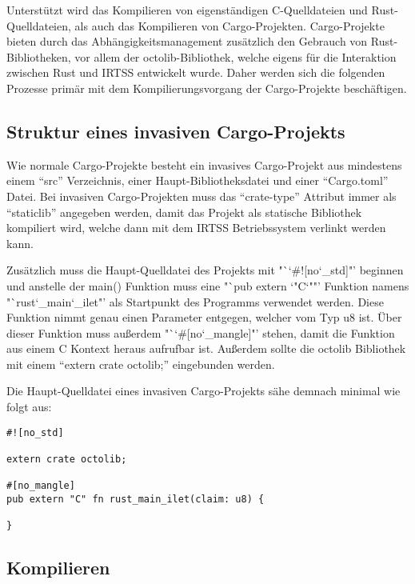 Unterstützt wird das Kompilieren von eigenständigen C-Quelldateien und Rust-Quelldateien, als auch das Kompilieren von
Cargo-Projekten. Cargo-Projekte bieten durch das Abhängigkeitsmanagement zusätzlich den Gebrauch von Rust-Bibliotheken, vor
allem der octolib-Bibliothek, welche eigens für die Interaktion zwischen Rust und IRTSS entwickelt wurde. Daher werden sich die
folgenden Prozesse primär mit dem Kompilierungsvorgang der Cargo-Projekte beschäftigen.

\subsection{Struktur eines invasiven Cargo-Projekts}

Wie normale Cargo-Projekte besteht ein invasives Cargo-Projekt aus mindestens einem "`src"' Verzeichnis, einer Haupt-Bibliotheksdatei
und einer "`Cargo.toml"' Datei. Bei invasiven Cargo-Projekten muss das "`crate-type"' Attribut immer als
"`staticlib"' angegeben werden,
damit das Projekt als statische Bibliothek kompiliert wird, welche dann mit dem IRTSS Betriebssystem verlinkt werden kann.

Zusätzlich muss die Haupt-Quelldatei des Projekts mit "`\char`#![no\char`_std]"' beginnen und anstelle der main()
Funktion muss eine "`pub extern \char`"C\char`""' Funktion namens "`rust\char`_main\char`_ilet"' als Startpunkt des Programms
verwendet werden.
Diese Funktion nimmt genau einen Parameter entgegen, welcher vom Typ u8 ist.
Über dieser  Funktion muss außerdem "`\char`#[no\char`_mangle]"' stehen, damit die Funktion aus einem C Kontext heraus
aufrufbar ist.
Außerdem sollte die octolib Bibliothek mit einem "`extern crate octolib;"' eingebunden werden.

Die Haupt-Quelldatei eines invasiven Cargo-Projekts sähe demnach minimal wie folgt aus:
\begin{verbatim}
#![no_std]

extern crate octolib;

#[no_mangle]
pub extern "C" fn rust_main_ilet(claim: u8) {

}
\end{verbatim}

\subsection{Kompilieren}

